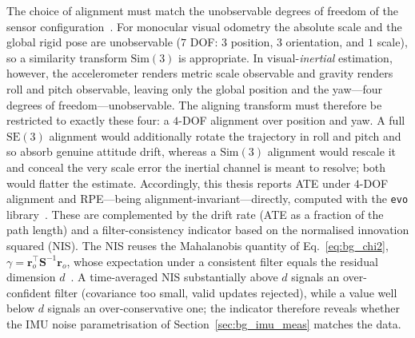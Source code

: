 The choice of alignment must match the unobservable degrees of freedom of the sensor configuration~\cite{Zhang_2018}. For monocular visual odometry the absolute scale and the global rigid pose are unobservable ($7$ DOF: $3$ position, $3$ orientation, and $1$ scale), so a similarity transform $\mathrm{Sim}(3)$ is appropriate. In visual-\emph{inertial} estimation, however, the accelerometer renders metric scale observable and gravity renders roll and pitch observable, leaving only the global position and the yaw---four degrees of freedom---unobservable. The aligning transform must therefore be restricted to exactly these four: a $4$-DOF alignment over position and yaw. A full $\mathrm{SE}(3)$ alignment would additionally rotate the trajectory in roll and pitch and so absorb genuine attitude drift, whereas a $\mathrm{Sim}(3)$ alignment would rescale it and conceal the very scale error the inertial channel is meant to resolve; both would flatter the estimate. Accordingly, this thesis reports ATE under $4$-DOF alignment and RPE---being alignment-invariant---directly, computed with the \texttt{evo} library~\cite{Grupp_2017}. These are complemented by the drift rate (ATE as a fraction of the path length) and a filter-consistency indicator based on the normalised innovation squared (NIS). The NIS reuses the Mahalanobis quantity of Eq.~\ref{eq:bg_chi2}, $\gamma = \mathbf{r}_o^{\top}\mathbf{S}^{-1}\mathbf{r}_o$, whose expectation under a consistent filter equals the residual dimension $d$~\cite{BarShalom_2001}. A time-averaged NIS substantially above $d$ signals an over-confident filter (covariance too small, valid updates rejected), while a value well below $d$ signals an over-conservative one; the indicator therefore reveals whether the IMU noise parametrisation of Section~\ref{sec:bg_imu_meas} matches the data.